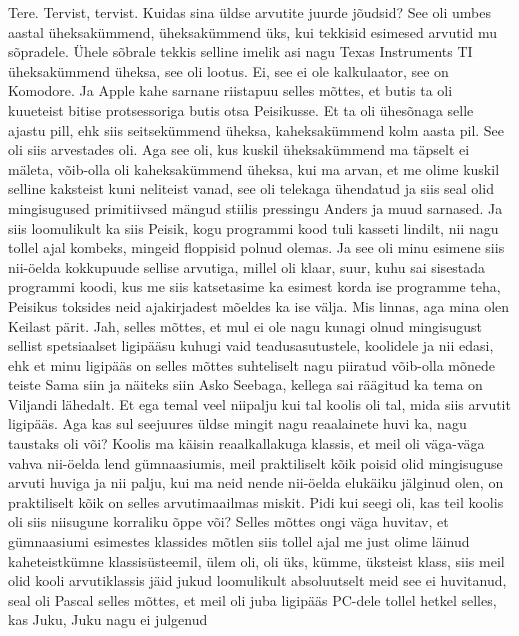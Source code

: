 Tere. Tervist, tervist. Kuidas sina üldse arvutite juurde jõudsid?
See oli umbes aastal üheksakümmend, üheksakümmend üks, kui tekkisid esimesed arvutid mu sõpradele. Ühele sõbrale tekkis selline imelik asi nagu Texas Instruments TI üheksakümmend üheksa, see oli lootus. Ei, see ei ole kalkulaator, see on Komodore. Ja Apple kahe sarnane riistapuu selles mõttes, et butis ta oli kuueteist bitise protsessoriga butis otsa Peisikusse. Et ta oli ühesõnaga selle ajastu pill, ehk siis seitsekümmend üheksa, kaheksakümmend kolm aasta pil.
See oli siis arvestades oli.
Aga see oli, kus kuskil üheksakümmend ma täpselt ei mäleta, võib-olla oli kaheksakümmend üheksa, kui ma arvan, et me olime kuskil selline kaksteist kuni neliteist vanad, see oli telekaga ühendatud ja siis seal olid mingisugused primitiivsed mängud stiilis pressingu Anders ja muud sarnased. Ja siis loomulikult ka siis Peisik, kogu programmi kood tuli kasseti lindilt, nii nagu tollel ajal kombeks, mingeid floppisid polnud olemas. Ja see oli minu esimene siis nii-öelda kokkupuude sellise arvutiga, millel oli klaar, suur, kuhu sai sisestada programmi koodi, kus me siis katsetasime ka esimest korda ise programme teha, Peisikus toksides neid ajakirjadest mõeldes ka ise välja. Mis linnas, aga mina olen Keilast pärit.
Jah, selles mõttes, et mul ei ole nagu kunagi olnud mingisugust sellist spetsiaalset ligipääsu kuhugi vaid teadusasutustele, koolidele ja nii edasi, ehk et minu ligipääs on selles mõttes suhteliselt nagu piiratud võib-olla mõnede teiste
Sama siin ja näiteks siin Asko Seebaga, kellega sai räägitud ka tema on Viljandi lähedalt. Et ega temal veel niipalju kui tal koolis oli tal, mida siis arvutit ligipääs. Aga kas sul seejuures üldse mingit nagu reaalainete huvi ka, nagu taustaks oli või?
Koolis ma käisin reaalkallakuga klassis, et meil oli väga-väga vahva nii-öelda lend gümnaasiumis, meil praktiliselt kõik poisid olid mingisuguse arvuti huviga ja nii palju, kui ma neid nende nii-öelda elukäiku jälginud olen, on praktiliselt kõik on selles arvutimaailmas miskit.
Pidi kui seegi oli, kas teil koolis oli siis niisugune korraliku õppe või?
Selles mõttes ongi väga huvitav, et gümnaasiumi esimestes klassides mõtlen siis tollel ajal me just olime läinud kaheteistkümne klassisüsteemil, ülem oli, oli üks, kümme, üksteist klass, siis meil olid kooli arvutiklassis jäid jukud loomulikult absoluutselt meid see ei huvitanud, seal oli Pascal selles mõttes, et meil oli juba ligipääs PC-dele tollel hetkel selles, kas Juku, Juku nagu ei julgenud

